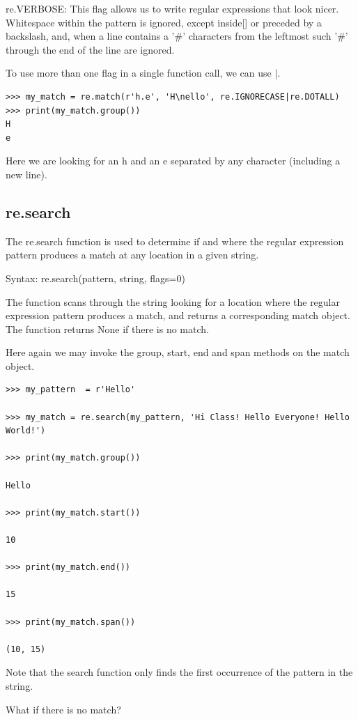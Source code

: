 \documentclass{article}
\begin{document}
re.VERBOSE:  This flag allows us to write regular expressions that look nicer. Whitespace within the pattern is ignored, except inside[]  or preceded by a backslash, and, when a line contains a '\#' characters from the leftmost such '\#' through the end of the line are ignored.

To use more than one flag in a single function call, we can use |.

\begin{lstlisting}
>>> my_match = re.match(r'h.e', 'H\nello', re.IGNORECASE|re.DOTALL)
>>> print(my_match.group())
H
e
\end{lstlisting}

Here we are looking for an h and an e separated by any character (including a new line).

\subsection{re.search}
The re.search function is used to determine if and where the regular expression pattern produces a match at any location in a given string.

Syntax: re.search(pattern, string, flags=0)

The function scans through the string looking for a location where the regular expression pattern produces a match, and returns a corresponding match object. The function returns None if there is no match.

Here again we may invoke the group, start, end and span methods  on the match object.

\begin{lstlisting}
>>> my_pattern  = r'Hello'

>>> my_match = re.search(my_pattern, 'Hi Class! Hello Everyone! Hello World!')

>>> print(my_match.group())

Hello

>>> print(my_match.start())

10

>>> print(my_match.end())

15

>>> print(my_match.span())

(10, 15)
\end{lstlisting}

Note that the search function only finds the first occurrence of the pattern in the string.

What if there is no match?
\end{document}
